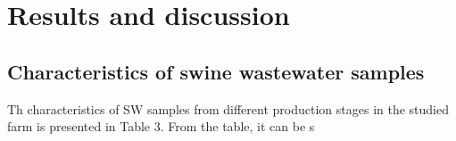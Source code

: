 \section{Results and discussion}
\subsection{Characteristics of swine wastewater samples}
Th characteristics of SW samples from different production stages in the studied farm is presented in Table 3. From the table, it can be s